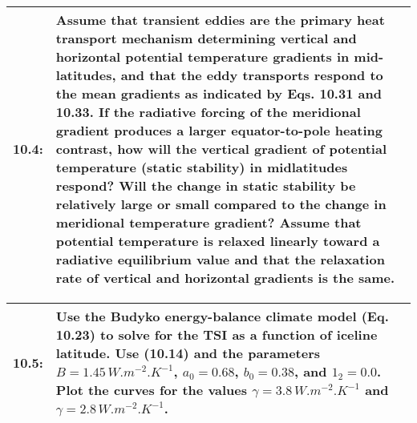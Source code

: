 \documentclass[12pt]{article}
\newcommand*{\problem}[2]{
    \begin{table}[ht]
    \centering
        \begin{tabular}{ | p{.1\linewidth} p{.9\linewidth} | }
            \hline
            \vspace{.3em}\textbf{\large#1:} & \vspace{.3em}\small{#2}\hspace{.2em}\vspace{.5em} \\ \hline
        \end{tabular}
    \end{table}
}
\begin{document}
\problem{10.4}{
    Assume that transient eddies are the primary heat transport mechanism determining vertical and horizontal potential temperature gradients in mid-latitudes, and that the eddy transports respond to the mean gradients as indicated by Eqs. 10.31 and 10.33.
    If the radiative forcing of the meridional gradient produces a larger equator-to-pole heating contrast, how will the vertical gradient of potential temperature (static stability) in midlatitudes respond?
    Will the change in static stability be relatively large or small compared to the change in meridional temperature gradient?
    Assume that potential temperature is relaxed linearly toward a radiative equilibrium value and that the relaxation rate of vertical and horizontal gradients is the same.
} %

\problem{10.5}{
    Use the Budyko energy-balance climate model (Eq. 10.23) to solve for the TSI as a function of iceline latitude. Use (10.14) and the parameters $B=1.45\,\si{W.m^{-2}.K^{-1}}$, $a_0 = 0.68$, $b_0 = 0.38$, and $1_2 = 0.0$. Plot the curves for the values $\gamma=3.8\,\si{W.m^{-2}.K^{-1}}$ and $\gamma = 2.8\,\si{W.m^{-2}.K^{-1}}$.
} %
\end{document}
